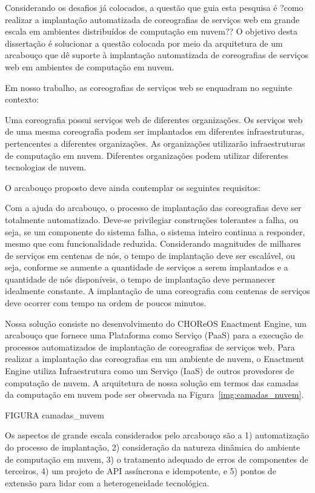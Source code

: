 Considerando os desafios já colocados, a questão que guia esta pesquisa é ?como realizar a implantação automatizada de coreografias de serviços web em grande escala em ambientes distribuídos de computação em nuvem?? O objetivo desta dissertação é solucionar a questão colocada por meio da arquitetura de um arcabouço que dê suporte à implantação automatizada de coreografias de serviços web em ambientes de computação em nuvem. 

Em nosso trabalho, as coreografias de serviços web se enquadram no seguinte contexto:

Uma coreografia possui serviços web de diferentes organizações.
Os serviços web de uma mesma coreografia podem ser implantados em diferentes infraestruturas, pertencentes a diferentes organizações.
As organizações utilizarão infraestruturas de computação em nuvem.
Diferentes organizações podem utilizar diferentes tecnologias de nuvem.

O arcabouço proposto deve ainda contemplar os seguintes requisitos:

Com a ajuda do arcabouço, o processo de implantação das coreografias deve ser totalmente automatizado.
Deve-se privilegiar construções tolerantes a falha, ou seja, se um componente do sistema falha, o sistema inteiro continua a responder, mesmo que com funcionalidade reduzida.
Considerando magnitudes de milhares de serviços em centenas de nós, o tempo de implantação deve ser escalável, ou seja, conforme se aumente a quantidade de serviços a serem implantados e a quantidade de nós disponíveis, o tempo de implantação deve permanecer idealmente constante. 
A implantação de uma coreografia com centenas de serviços deve ocorrer com tempo na ordem de poucos minutos.

Nossa solução consiste no desenvolvimento do CHOReOS Enactment Engine, um arcabouço que fornece uma Plataforma como Serviço (PaaS) para a execução de processos automatizados de implantação de coreografias de serviços web. Para realizar a implantação das coreografias em um ambiente de nuvem, o Enactment Engine utiliza Infraestrutura como um Serviço (IaaS) de outros provedores de computação de nuvem. A arquitetura de nossa solução em termos das camadas da computação em nuvem pode ser observada na Figura~\ref{img:camadas_nuvem}.

FIGURA camadas\_nuvem

Os aspectos de grande escala considerados pelo arcabouço são a 1) automatização do processo de implantação, 2) consideração da natureza dinâmica do ambiente de computação em nuvem, 3) o tratamento adequado de erros de componentes de terceiros, 4) um projeto de API assíncrona e idempotente, e 5) pontos de extensão para lidar com a heterogeneidade tecnológica.

